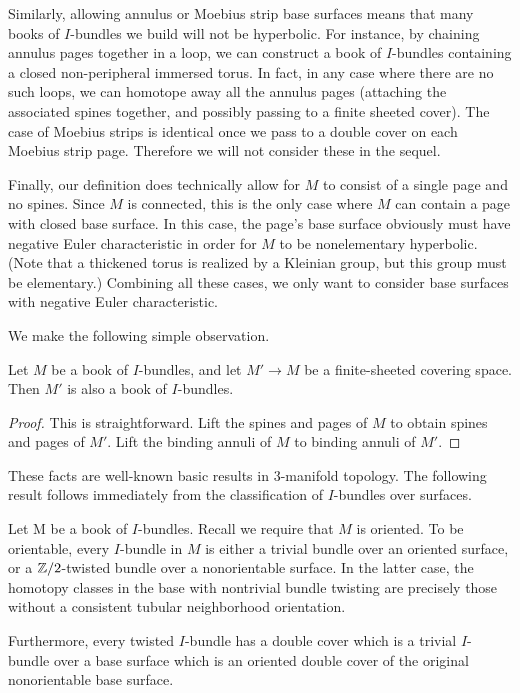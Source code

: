 Similarly, allowing annulus or Moebius strip base surfaces means that many
books of $I$-bundles we build will not be hyperbolic. For instance, by chaining
annulus pages together in a loop, we can construct a book of $I$-bundles
containing a closed non-peripheral immersed torus. In fact, in any case where
there are no such loops, we can homotope away all the annulus pages (attaching
the associated spines together, and possibly passing to a finite sheeted
cover).  The case of Moebius strips is identical once we pass to a double cover
on each Moebius strip page. Therefore we will not consider these in the sequel.

Finally, our definition does technically allow for $M$ to consist of a single
page and no spines. Since $M$ is connected, this is the only case where $M$ can
contain a page with closed base surface. In this case, the page's base surface
obviously must have negative Euler characteristic in order for $M$ to be
nonelementary hyperbolic. (Note that a thickened torus is realized by
a Kleinian group, but this group must be elementary.) Combining all these
cases, we only want to consider base surfaces with negative Euler
characteristic.

We make the following simple observation.

\begin{prop}

Let $M$ be a book of $I$-bundles, and let $M' \to M$ be a finite-sheeted
covering space.  Then $M'$ is also a book of $I$-bundles.

\end{prop}

\begin{proof}

This is straightforward. Lift the spines and pages of $M$ to obtain spines and
pages of $M'$. Lift the binding annuli of $M$ to binding annuli of $M'$.

\end{proof}

These facts are well-known basic results in $3$-manifold topology.  The
following result follows immediately from the classification of $I$-bundles
over surfaces.

\begin{prop}

Let M be a book of $I$-bundles. Recall we require that $M$ is oriented. To be
orientable, every $I$-bundle in $M$ is either a trivial bundle over an oriented
surface, or a $\mathbb{Z}/2$-twisted bundle over a nonorientable surface. In the
latter case, the homotopy classes in the base with nontrivial bundle twisting
are precisely those without a consistent tubular neighborhood orientation.

Furthermore, every twisted $I$-bundle has a double cover which is a trivial
$I$-bundle over a base surface which is an oriented double cover of the
original nonorientable base surface.

\end{prop}

